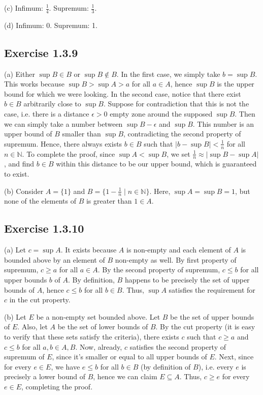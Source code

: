 \documentclass{book}
\begin{document}
\noindent
(c)
Infimum: $\frac{1}{4}$. Supremum: $\frac{1}{3}$.

\noindent
(d)
Infimum: 0. Supremum: 1.

\subsection*{Exercise 1.3.9}
(a)
Either $\sup B \in B$ or $\sup B \not \in B$. In the first case, we simply take $b = \sup B$. This works because $\sup B > \sup A > a$ for all $a \in A$, hence $\sup B$ is the upper bound for which we were looking. In the second case, notice that there exist $b \in B$ arbitrarily close to $\sup B$. Suppose for contradiction that this is not the case, i.e. there is a distance $\epsilon > 0$ empty zone around the supposed $\sup B$. Then we can simply take a number between $\sup B - \epsilon$ and $\sup B$. This number is an upper bound of $B$ smaller than $\sup B$, contradicting the second property of supremum. Hence, there always exists $b \in B$ such that $|b - \sup B| < \frac{1}{n}$ for all $n \in \mathbb{N}$. To complete the proof, since $\sup A < \sup B$, we set $\frac{1}{n} \approx |\sup B - \sup A|$, and find $b \in B$ within this distance to be our upper bound, which is guaranteed to exist.

\noindent
(b)
Consider $A = \{ 1 \}$ and $B = \{ 1 - \frac{1}{n} \mid n \in \mathbb{N} \}$. Here, $\sup A = \sup B = 1$, but none of the elements of $B$ is greater than $1 \in A$.

\subsection*{Exercise 1.3.10}
(a)
Let $c = \sup A$. It exists because $A$ is non-empty and each element of $A$ is bounded above by an element of $B$ non-empty as well. By first property of supremum, $c \geq a$ for all $a \in A$. By the second property of supremum, $c \leq b$ for all upper bounds $b$ of $A$. By definition, $B$ happens to be precisely the set of upper bounds of $A$, hence $c \leq b$ for all $b \in B$. Thus, $\sup A$ satisfies the requirement for $c$ in the cut property.

\noindent
(b)
Let $E$ be a non-empty set bounded above. Let $B$ be the set of upper bounds of $E$. Also, let $A$ be the set of lower bounds of $B$. By the cut property (it is easy to verify that these sets satisfy the criteria), there exists $c$ such that $c \geq a$ and $c \leq b$ for all $a, b \in A, B$. Now, already, $c$ satisfies the second property of supremum of $E$, since it's smaller or equal to all upper bounds of $E$. Next, since for every $e \in E$, we have $e \leq b$ for all $b \in B$ (by definition of $B$), i.e. every $e$ is precisely a lower bound of $B$, hence we can claim $E \subseteq A$. Thus, $c \geq e$ for every $e \in E$, completing the proof.
\end{document}
